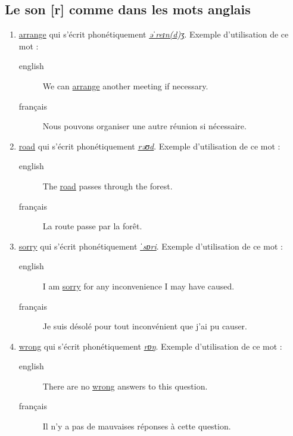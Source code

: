 \subsection{Le son [r] comme dans les mots anglais}
\label{sec:org5353d95}
\begin{enumerate}
\item \href{http://www.wordreference.com/enfr/arrange}{arrange} qui s'écrit phonétiquement \href{https://en.oxforddictionaries.com/definition/arrange}{\emph{əˈreɪn(d)ʒ}}. Exemple
d'utilisation de ce mot :
\begin{description}
\item[{english}] \textenglish{We can \href{https://youtu.be/oD5RzpwbrIc}{arrange} another meeting if necessary.}
\item[{français}] Nous pouvons organiser une autre réunion si
nécessaire.
\end{description}
\item \href{http://www.wordreference.com/enfr/road}{road} qui s'écrit phonétiquement \href{https://en.oxforddictionaries.com/definition/road}{\emph{rəʊd}}. Exemple d'utilisation de ce
mot :
\begin{description}
\item[{english}] \textenglish{The \href{https://youtu.be/bO2xMNU9bTw}{road} passes through the forest.}
\item[{français}] La route passe par la forêt.
\end{description}
\item \href{http://www.wordreference.com/enfr/sorry}{sorry} qui s'écrit phonétiquement \href{https://en.oxforddictionaries.com/definition/sorry}{\emph{ˈsɒri}}. Exemple d'utilisation de
ce mot :
\begin{description}
\item[{english}] \textenglish{I am \href{https://youtu.be/ahCwKDyS5OE}{sorry} for any inconvenience I may have caused.}
\item[{français}] Je suis désolé pour tout inconvénient que j'ai pu causer.
\end{description}
\item \href{http://www.wordreference.com/enfr/wrong}{wrong} qui s'écrit phonétiquement \href{https://en.oxforddictionaries.com/definition/wrong}{\emph{rɒŋ}}. Exemple d'utilisation de ce
mot :
\begin{description}
\item[{english}] \textenglish{There are no \href{https://youtu.be/a5e0z1\_uwHY}{wrong} answers to this question.}
\item[{français}] Il n'y a pas de mauvaises réponses à cette question.
\end{description}
\end{enumerate}
